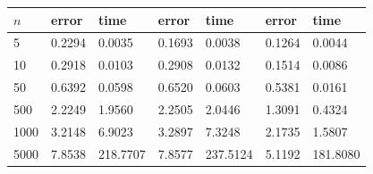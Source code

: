 \documentclass[11pt,reqno]{amsart}
\newcommand{\1}{{\bf 1}}
\newcommand{\2}{{\bf 2}}
\numberwithin{equation}{section}
\theoremstyle{remark}
\begin{document}
{\begin{figure}[htbp]
\begin{minipage}{0.51\textwidth}
\begin{tabular}{ |p{0.5cm} |p{0.8cm}|p{1cm}|p{0.8cm}|p{1cm}| p{0.8cm}| p{1cm}|}
							\hline
							$n$ &error&time&error&time&error&time\\
							\hline
							5  & 0.2294  &  0.0035 &0.1693  & 0.0038 & 0.1264  &  0.0044  \\
							\hline
							10 &  0.2918 &0.0103   & 0.2908 &  0.0132 &  0.1514 & 0.0086  \\
							\hline
							50  & 0.6392  &  0.0598 & 0.6520 & 0.0603  &  0.5381 &  0.0161  \\
							\hline
							500& 2.2249  &  1.9560 & 2.2505 & 2.0446  & 1.3091  &  0.4324  \\
							\hline
							1000&  3.2148 & 6.9023  & 3.2897 & 7.3248  & 2.1735  &  1.5807  \\
							\hline
							5000 & 7.8538  &  218.7707 & 7.8577 & 237.5124  & 5.1192  & 181.8080   \\
							\hline
						\end{tabular}
					\end{minipage}
				\end{figure}

				
}
\end{document}
